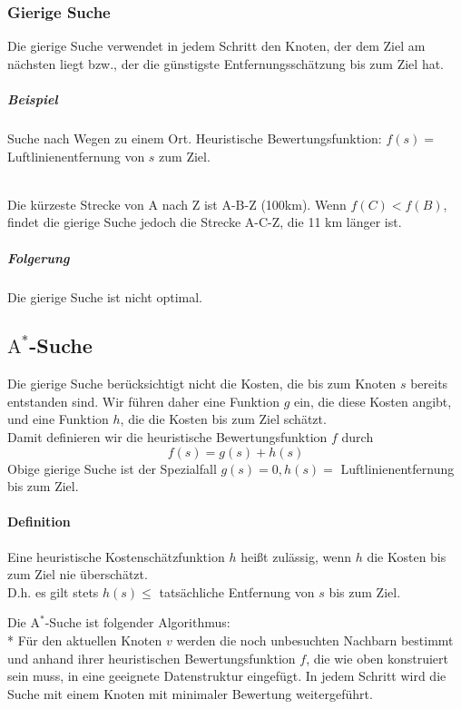 \documentclass[a4paper]{scrartcl}
\begin{document}
\subsubsection{Gierige Suche}
Die gierige Suche verwendet in jedem Schritt den Knoten, der dem Ziel am nächsten liegt bzw., der die günstigste Entfernungsschätzung bis zum Ziel hat.
\subparagraph{Beispiel} Suche nach Wegen zu einem Ort.
Heuristische Bewertungsfunktion: $f(s) =$ Luftlinienentfernung von $s$ zum Ziel.\\
\\
Die kürzeste Strecke von A nach Z ist A-B-Z (100km). Wenn $f(C) < f(B)$, findet die gierige Suche jedoch die Strecke A-C-Z, die 11 km länger ist.
\subparagraph{Folgerung} Die gierige Suche ist nicht optimal.

\subsection{$\text{A}^*$-Suche}
Die gierige Suche berücksichtigt nicht die Kosten, die bis zum Knoten $s$ bereits entstanden sind. Wir führen daher eine Funktion $g$ ein, die diese Kosten angibt, und eine Funktion $h$, die die Kosten bis zum Ziel schätzt.\\
Damit definieren wir die heuristische Bewertungsfunktion $f$ durch \[f(s) = g(s) + h(s)\]
Obige gierige Suche ist der Spezialfall $g(s) = 0, h(s) =$ Luftlinienentfernung bis zum Ziel.

\paragraph{Definition} Eine heuristische Kostenschätzfunktion $h$ heißt zulässig, wenn $h$ die Kosten bis zum Ziel nie überschätzt.\\
D.h. es gilt stets $h(s) \leq$ tatsächliche Entfernung von $s$ bis zum Ziel.

Die $\text{A}^*$-Suche ist folgender Algorithmus:\\*
Für den aktuellen Knoten $v$ werden die noch unbesuchten Nachbarn bestimmt und anhand ihrer heuristischen Bewertungsfunktion $f$, die wie oben konstruiert sein muss, in eine geeignete Datenstruktur eingefügt. In jedem Schritt wird die Suche mit einem Knoten mit minimaler Bewertung weitergeführt.
\end{document}

